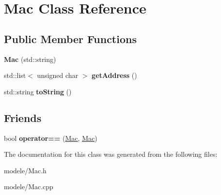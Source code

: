 \hypertarget{class_mac}{\section{Mac Class Reference}
\label{class_mac}
}
\subsection*{Public Member Functions}
\begin{DoxyCompactItemize}
\item 
\hypertarget{class_mac_affce3a3ba7167f776972242a288899a8}{{\bfseries Mac} (std\-::string)}\label{class_mac_affce3a3ba7167f776972242a288899a8}

\item 
\hypertarget{class_mac_a14f7f69aacd9402ff73ba577c5ef7186}{std\-::list$<$ unsigned char $>$ {\bfseries get\-Address} ()}\label{class_mac_a14f7f69aacd9402ff73ba577c5ef7186}

\item 
\hypertarget{class_mac_aea60906dbb76dcc2a86ca0649ff02016}{std\-::string {\bfseries to\-String} ()}\label{class_mac_aea60906dbb76dcc2a86ca0649ff02016}

\end{DoxyCompactItemize}
\subsection*{Friends}
\begin{DoxyCompactItemize}
\item 
\hypertarget{class_mac_a400fb6c54cafad0d6f8218226ff890a4}{bool {\bfseries operator==} (\hyperlink{class_mac}{Mac}, \hyperlink{class_mac}{Mac})}\label{class_mac_a400fb6c54cafad0d6f8218226ff890a4}

\end{DoxyCompactItemize}


The documentation for this class was generated from the following files\-:\begin{DoxyCompactItemize}
\item 
modele/Mac.\-h\item 
modele/Mac.\-cpp\end{DoxyCompactItemize}
